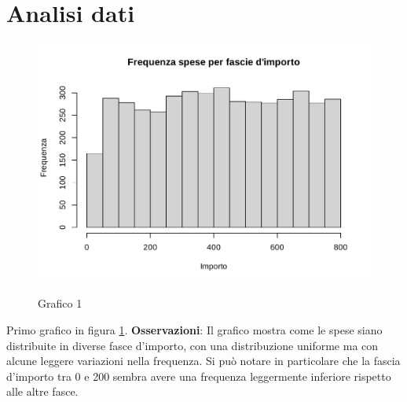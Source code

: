 \section{Analisi dati}
\label{analisiDati}

\begin{figure}[t]
	\caption{Grafico 1}
	\includegraphics[page=1,width=\textwidth]{../R/grafici.pdf}
	\label{fig1}
\end{figure}

Primo grafico in figura \ref{fig1}. \textbf{Osservazioni}: Il grafico mostra come le spese siano distribuite in diverse fasce d'importo, con una distribuzione uniforme ma con alcune leggere variazioni nella frequenza. Si può notare in particolare che la fascia d'importo tra 0 e 200 sembra avere una frequenza leggermente inferiore rispetto alle altre fasce.

\clearpage

